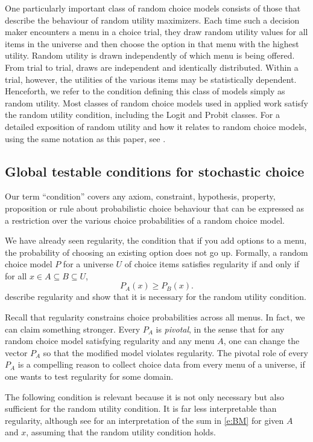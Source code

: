 \documentclass[11pt,letter]{article}
\newcommand{\menu}{menu}
\newcommand{\menus}{menus}
\newcommand{\univ}{U}
\begin{document}
One particularly important class of random choice models consists of those that describe the behaviour of random utility maximizers.
Each time such a decision maker encounters a \menu{} in a choice trial, they draw random utility values for all items in the universe and then choose the option in that \menu{} with the highest utility.
Random utility is drawn independently of which \menu{} is being offered.
From trial to trial, draws are independent and identically distributed.
Within a trial, however, the utilities of the various items may be statistically dependent.
Henceforth, we refer to the condition defining this class of models simply as random utility.
Most classes of random choice models used in applied work satisfy the random utility condition, including the Logit and Probit classes.
For a detailed exposition of random utility and how it relates to random choice models, using the same notation as this paper, see \citet{McCaStobMarlParkBrow20}.

\subsection{Global testable conditions for stochastic choice}\label{s:conditions}

Our term ``condition'' covers any axiom, constraint, hypothesis, property, proposition or rule about probabilistic choice behaviour that can be expressed as a restriction over the various choice probabilities of a random choice model.

We have already seen regularity, the condition that if you add options to a \menu{}, the probability of choosing an existing option does not go up.
Formally, a random choice model $P$ for a universe $\univ$ of choice items satisfies regularity if and only if for all $x \in A \subseteq B \subseteq \univ$,
\[
  P_A(x) \geq P_B(x).
\]
\citet{LuceSupp65} describe regularity and show that it is necessary for the random utility condition.

Recall that regularity constrains choice probabilities across all \menus{}.
In fact, we can claim something stronger.
Every $P_A$ is {\em pivotal}, in the sense that for any random choice model satisfying regularity and any \menu{} $A$, one can change the vector $P_A$ so that the modified model violates regularity.
The pivotal role of every $P_A$ is a compelling reason to collect choice data from every \menu{} of a universe, if one wants to test regularity for some domain.

The following condition is relevant because it is not only necessary but also sufficient for the random utility condition.
It is far less interpretable than regularity, although see \citet{BarbPatt86} for an interpretation of the sum in \eqref{e:BM} for given $A$ and $x$, assuming that the random utility condition holds.
\end{document}
